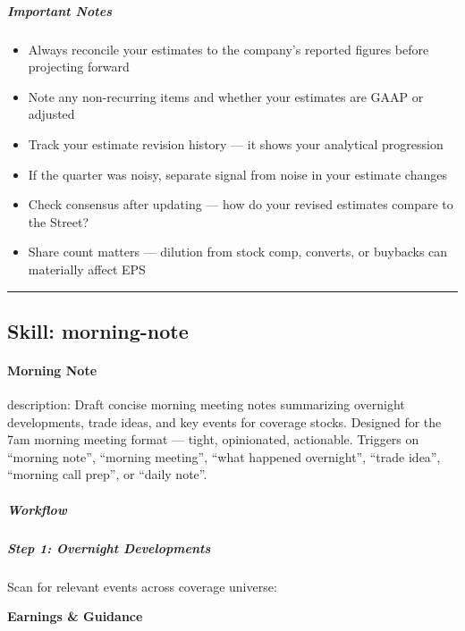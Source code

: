 \documentclass[11pt]{article}
\begin{document}
\subparagraph{Important Notes}\mbox{}\par

\begin{itemize}[leftmargin=*,itemsep=2pt,topsep=2pt]
\item {} Always reconcile your estimates to the company's reported figures before projecting forward
\item {} Note any non-recurring items and whether your estimates are GAAP or adjusted
\item {} Track your estimate revision history — it shows your analytical progression
\item {} If the quarter was noisy, separate signal from noise in your estimate changes
\item {} Check consensus after updating — how do your revised estimates compare to the Street?
\item {} Share count matters — dilution from stock comp, converts, or buybacks can materially affect EPS
\end{itemize}

\vspace{0.8em}\hrule\vspace{0.8em}

\subsection{Skill: morning-note}\label{file:skills-morning-note-SKILL-md}

\paragraph{Morning Note}\mbox{}\par

description: Draft concise morning meeting notes summarizing overnight developments, trade ideas, and key events for coverage stocks. Designed for the 7am morning meeting format — tight, opinionated, actionable. Triggers on ``morning note'', ``morning meeting'', ``what happened overnight'', ``trade idea'', ``morning call prep'', or ``daily note''.


\subparagraph{Workflow}\mbox{}\par

\subparagraph{Step 1: Overnight Developments}\mbox{}\par

Scan for relevant events across coverage universe:


\textbf{Earnings \& Guidance}
\end{document}
